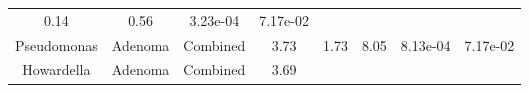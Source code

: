 \documentclass[12pt,]{article}
\begin{document}
\begin{longtable}[]{@{}cccccccc@{}}
\begin{minipage}[t]{0.14\columnwidth}
0.14\strut
\end{minipage} & \begin{minipage}[t]{0.14\columnwidth}\centering\strut
0.56\strut
\end{minipage} & \begin{minipage}[t]{0.06\columnwidth}\centering\strut
3.23e-04\strut
\end{minipage} & \begin{minipage}[t]{0.06\columnwidth}\centering\strut
7.17e-02\strut
\end{minipage}\tabularnewline
\begin{minipage}[t]{0.18\columnwidth}\centering\strut
Pseudomonas\strut
\end{minipage} & \begin{minipage}[t]{0.07\columnwidth}\centering\strut
Adenoma\strut
\end{minipage} & \begin{minipage}[t]{0.09\columnwidth}\centering\strut
Combined\strut
\end{minipage} & \begin{minipage}[t]{0.03\columnwidth}\centering\strut
3.73\strut
\end{minipage} & \begin{minipage}[t]{0.14\columnwidth}\centering\strut
1.73\strut
\end{minipage} & \begin{minipage}[t]{0.14\columnwidth}\centering\strut
8.05\strut
\end{minipage} & \begin{minipage}[t]{0.06\columnwidth}\centering\strut
8.13e-04\strut
\end{minipage} & \begin{minipage}[t]{0.06\columnwidth}\centering\strut
7.17e-02\strut
\end{minipage}\tabularnewline
\begin{minipage}[t]{0.18\columnwidth}\centering\strut
Howardella\strut
\end{minipage} & \begin{minipage}[t]{0.07\columnwidth}\centering\strut
Adenoma\strut
\end{minipage} & \begin{minipage}[t]{0.09\columnwidth}\centering\strut
Combined\strut
\end{minipage} & \begin{minipage}[t]{0.03\columnwidth}\centering\strut
3.69\strut
\end{minipage} & \begin{minipage}[t]{0.14\columnwidth}\centering\strut

\end{minipage}
\end{longtable}
\end{document}
